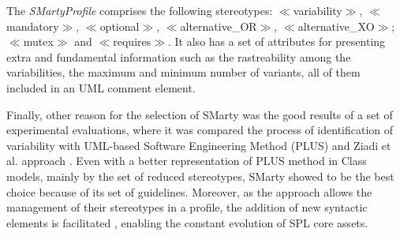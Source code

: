 The \textit{SMartyProfile} comprises the following stereotypes: $\ll$variability$\gg$, $\ll$mandatory$\gg$, $\ll$optional$\gg$, $\ll$alternative\_OR$\gg$, $\ll$alternative\_XO$\gg$; $\ll$mutex$\gg$ and $\ll$requires$\gg$. It also has a set of attributes for presenting extra and fundamental information such as the rastreability among the variabilities, the maximum and minimum number of variants, all of them included in an UML comment element.


Finally, other reason for the selection of SMarty was the good results of a set of experimental evaluations, where it was compared the process of identification of variability with UML-based Software Engineering Method (PLUS) and Ziadi et al. approach \cite{marcolino2013, MarcolinoJG14}. Even with a better representation of PLUS method in Class models, mainly by the set of reduced stereotypes, SMarty showed to be the best choice because of its set of guidelines. Moreover, as the approach allows the management of their stereotypes in a profile, the addition of new syntactic elements is facilitated \cite{deOliveira2013}, enabling the constant evolution of SPL core assets.

